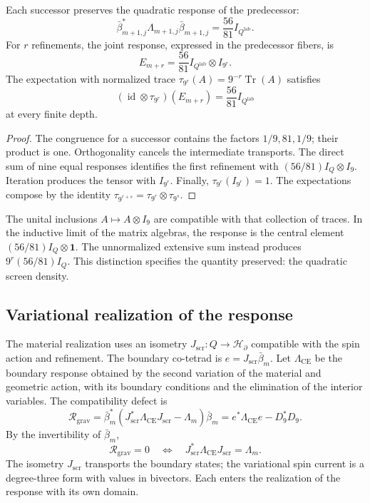 \begin{theorem}
\label{vii:thm:densidad}
Each successor preserves the quadratic response of the predecessor:
\[
 \bar\beta_{m+1,j}^*\Lambda_{m+1,j}\bar\beta_{m+1,j}
 =\frac{56}{81}I_{Q^{\mathrm{lab}}}.
\]
For \(r\) refinements, the joint response, expressed in the predecessor
fibers, is
\[
 E_{m+r}=\frac{56}{81}I_{Q^{\mathrm{lab}}}\otimes I_{9^r}.
\]
The expectation with normalized trace
\(\tau_{9^r}(A)=9^{-r}\operatorname{Tr}(A)\) satisfies
\[
 (\operatorname{id}\otimes\tau_{9^r})(E_{m+r})
 =\frac{56}{81}I_{Q^{\mathrm{lab}}}
\]
at every finite depth.
\end{theorem}

\begin{proof}
The congruence for a successor contains the factors \(1/9,81,1/9\);
their product is one. Orthogonality cancels the intermediate
transports. The direct sum of nine equal responses identifies
the first refinement with \((56/81)I_Q\otimes I_9\).
Iteration produces the tensor with \(I_{9^r}\).
Finally, \(\tau_{9^r}(I_{9^r})=1\). The expectations compose
by the identity
\(\tau_{9^{r+s}}=\tau_{9^r}\otimes\tau_{9^s}\).
\end{proof}

The unital inclusions \(A\mapsto A\otimes I_9\) are compatible with
that collection of traces. In the inductive limit of the matrix algebras,
the response is the central element
\((56/81)I_Q\otimes\mathbf1\). The unnormalized extensive sum instead
produces \(9^r(56/81)I_Q\). This distinction specifies the quantity
preserved: the quadratic screen density.

\subsection{Variational realization of the response}
\label{vii:sec:realizacion-respuesta}

The material realization uses an isometry
\(J_{\mathrm{scr}}:Q\longrightarrow\mathcal H_\partial\)
compatible with the spin action and refinement.
The boundary co-tetrad is \(e=J_{\mathrm{scr}}\bar\beta_m\).
Let \(\Lambda_{\mathrm{CE}}\) be the boundary response obtained
by the second variation of the material and geometric action, with its
boundary conditions and the elimination of the interior variables.
The compatibility defect is
\begin{equation}
 \mathcal R_{\mathrm{grav}}
 =\bar\beta_m^*
   (J_{\mathrm{scr}}^*\Lambda_{\mathrm{CE}}J_{\mathrm{scr}}-\Lambda_m)
   \bar\beta_m
 =e^*\Lambda_{\mathrm{CE}}e-D_9^*D_9.
 \label{vii:eq:defecto-respuesta}
\end{equation}
By the invertibility of \(\bar\beta_m\),
\[
 \mathcal R_{\mathrm{grav}}=0
 \quad\Longleftrightarrow\quad
 J_{\mathrm{scr}}^*\Lambda_{\mathrm{CE}}J_{\mathrm{scr}}=\Lambda_m.
\]
The isometry \(J_{\mathrm{scr}}\) transports the boundary states;
the variational spin current is a degree-three form with values
in bivectors. Each enters the realization of the response
with its own domain.

